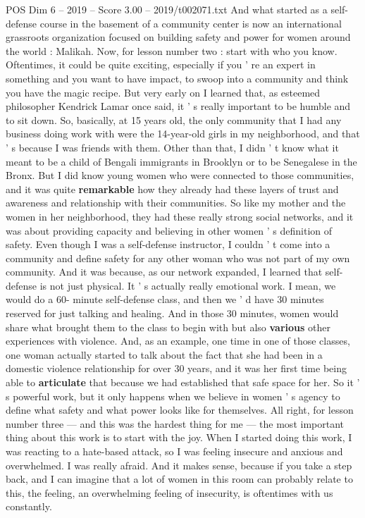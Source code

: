 \begin{textsample}{POS Dim 6 – 2019 – Score 3.00 – 2019/t002071.txt}
And what started as a self-defense course in the basement of a community center is now an international grassroots organization focused on building safety and power for women around the world : Malikah.
Now, for lesson number two : start with who you know.
Oftentimes, it could be quite exciting, especially if you ' re an expert in something and you want to have impact, to swoop into a community and think you have the magic recipe.
But very early on I learned that, as esteemed philosopher Kendrick Lamar once said, it ' s really important to be humble and to sit down.
So, basically, at 15 years old, the only community that I had any business doing work with were the 14-year-old girls in my neighborhood, and that ' s because I was friends with them.
Other than that, I didn ' t know what it meant to be a child of Bengali immigrants in Brooklyn or to be Senegalese in the Bronx.
But I did know young women who were connected to those communities, and it was quite \textbf{remarkable} how they already had these layers of trust and awareness and relationship with their communities.
So like my mother and the women in her neighborhood, they had these really strong social networks, and it was about providing capacity and believing in other women ' s definition of safety.
Even though I was a self-defense instructor, I couldn ' t come into a community and define safety for any other woman who was not part of my own community.
And it was because, as our network expanded, I learned that self-defense is not just physical.
It ' s actually really emotional work.
I mean, we would do a 60- minute self-defense class, and then we ' d have 30 minutes reserved for just talking and healing.
And in those 30 minutes, women would share what brought them to the class to begin with but also \textbf{various} other experiences with violence.
And, as an example, one time in one of those classes, one woman actually started to talk about the fact that she had been in a domestic violence relationship for over 30 years, and it was her first time being able to \textbf{articulate} that because we had established that safe space for her.
So it ' s powerful work, but it only happens when we believe in women ' s agency to define what safety and what power looks like for themselves.
All right, for lesson number three — and this was the hardest thing for me — the most important thing about this work is to start with the joy.
When I started doing this work, I was reacting to a hate-based attack, so I was feeling insecure and anxious and overwhelmed.
I was really afraid.
And it makes sense, because if you take a step back, and I can imagine that a lot of women in this room can probably relate to this, the feeling, an overwhelming feeling of insecurity, is oftentimes with us constantly.

\end{textsample}
